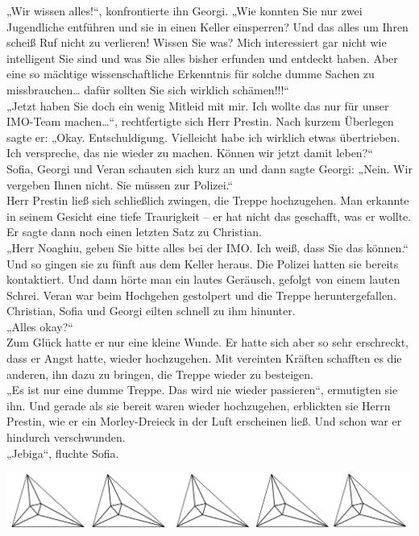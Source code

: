 \documentclass[oneside]{memoir}
\newcommand{\parasep}{
\bigskip
\bigskip
\begin{center} 
   \includegraphics[scale=.08]{parasep5.jpg} 
\end{center}
\bigskip
\bigskip
}
\begin{document}
„Wir wissen alles!“, konfrontierte ihn Georgi. „Wie konnten Sie nur zwei Jugendliche entführen und sie in einen Keller einsperren? Und das alles um Ihren scheiß Ruf nicht zu verlieren! Wissen Sie was? Mich interessiert gar nicht wie intelligent Sie sind und was Sie alles bisher erfunden und entdeckt haben. Aber eine so mächtige wissenschaftliche Erkenntnis für solche dumme Sachen zu missbrauchen\ldots{} dafür sollten Sie sich wirklich schämen!!!“ \\
„Jetzt haben Sie doch ein wenig Mitleid mit mir. Ich wollte das nur für unser IMO-Team machen\ldots“, rechtfertigte sich Herr Prestin. Nach kurzem Überlegen sagte er: „Okay. Entschuldigung. Vielleicht habe ich wirklich etwas übertrieben. Ich verspreche, das nie wieder zu machen. Können wir jetzt damit leben?“  \\
Sofia, Georgi und Veran schauten sich kurz an und dann sagte Georgi: 
„Nein. Wir vergeben Ihnen nicht. Sie müssen zur Polizei.“ \\
Herr Prestin ließ sich schließlich zwingen, die Treppe hochzugehen. Man erkannte in seinem Gesicht eine tiefe Traurigkeit -- er hat nicht das geschafft, was er wollte. Er sagte dann noch einen letzten Satz zu Christian. \\
„Herr Noaghiu, geben Sie bitte alles bei der IMO. Ich weiß, dass Sie das können.“ \\
Und so gingen sie zu fünft aus dem Keller heraus. Die Polizei hatten sie bereits kontaktiert. 
Und dann hörte man ein lautes Geräusch, gefolgt von einem lauten Schrei. Veran war beim Hochgehen gestolpert und die Treppe heruntergefallen. Christian, Sofia und Georgi eilten schnell zu ihm hinunter. \\
„Alles okay?“ \\
Zum Glück hatte er nur eine kleine Wunde. Er hatte sich aber so sehr erschreckt, dass er Angst hatte, wieder hochzugehen. Mit vereinten Kräften schafften es die anderen, ihn dazu zu bringen, die Treppe wieder zu besteigen. \\
„Es ist nur eine dumme Treppe. Das wird nie wieder passieren“, ermutigten sie ihn.
Und gerade als sie bereit waren wieder hochzugehen, erblickten sie Herrn Prestin, wie er ein Morley-Dreieck in der Luft erscheinen ließ. Und schon war er hindurch verschwunden.  \\
„Jebiga“, fluchte Sofia.

\parasep
     
\end{document}
